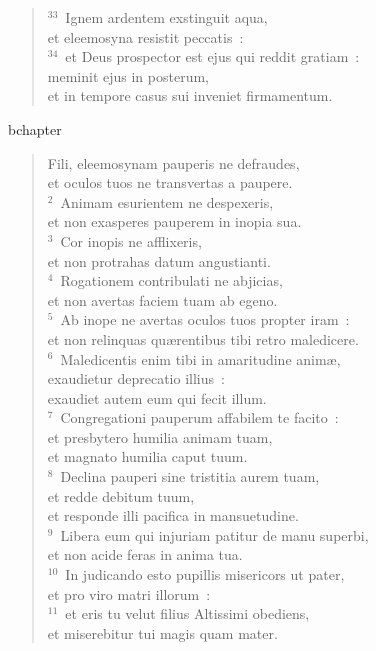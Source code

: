 \begin{verse}${}^{33}$~Ignem ardentem exstinguit aqua,\\ et eleemosyna resistit peccatis~:\\
${}^{34}$~et Deus prospector est ejus qui reddit gratiam~:\\ meminit ejus in posterum,\\ et in tempore casus sui inveniet firmamentum.\end{verse}


bchapter\begin{verse}\vspace{-19pt}Fili, eleemosynam pauperis ne defraudes,\\ et oculos tuos ne transvertas a paupere.\\
${}^{2}$~Animam esurientem ne despexeris,\\ et non exasperes pauperem in inopia sua.\\
${}^{3}$~Cor inopis ne afflixeris,\\ et non protrahas datum angustianti.\\
${}^{4}$~Rogationem contribulati ne abjicias,\\ et non avertas faciem tuam ab egeno.\\
${}^{5}$~Ab inope ne avertas oculos tuos propter iram~:\\ et non relinquas qu\ae rentibus tibi retro maledicere.\\
${}^{6}$~Maledicentis enim tibi in amaritudine anim\ae ,\\ exaudietur deprecatio illius~:\\ exaudiet autem eum qui fecit illum.\\
${}^{7}$~Congregationi pauperum affabilem te facito~:\\ et presbytero humilia animam tuam,\\ et magnato humilia caput tuum.\\
${}^{8}$~Declina pauperi sine tristitia aurem tuam,\\ et redde debitum tuum,\\ et responde illi pacifica in mansuetudine.\\
${}^{9}$~Libera eum qui injuriam patitur de manu superbi,\\ et non acide feras in anima tua.\\
${}^{10}$~In judicando esto pupillis misericors ut pater,\\ et pro viro matri illorum~:\\
${}^{11}$~et eris tu velut filius Altissimi obediens,\\ et miserebitur tui magis quam mater.\end{verse}


